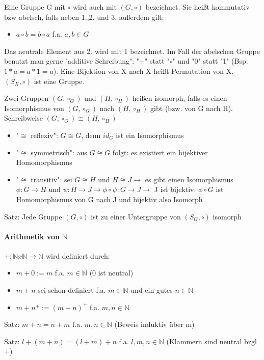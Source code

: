 \documentclass[10pt,landscape]{article}
\begin{document}
\begin{multicols}{3}
Eine Gruppe G mit $\circ$ wird auch mit $(G, \circ)$ bezeichnet. Sie heißt kommutativ bzw abelsch, falls neben 1.,2. und 3. außerdem gilt:
\begin{itemize}
    \item $a\circ b = b\circ a$ f.a. $a,b \in G$
\end{itemize}

Das neutrale Element aus 2. wird mit 1 bezeichnet. Im Fall der abelschen Gruppe benutzt man gerne "additive Schreibung": "+" statt "$\circ$" und "0" statt "1" (Bsp: $1*a = a*1 = a$).
Eine Bijektion von X nach X heißt Permutation von X. $(S_X, \circ)$ ist eine Gruppe.

Zwei Gruppen $(G, \circ_G)$ und $(H,\circ_H)$ heißen isomorph, falls es einen Isomorphismus von $(G,\circ_G)$ nach $(H,\circ_H)$ gibt (bzw. von G nach H). Schreibweise $(G,\circ_G)\cong (H,\circ_H)$
\begin{itemize}
    \item "$\cong$ reflexiv": $G\cong G$, denn $id_G$ ist ein Isomorphismus
    \item "$\cong$ symmetrisch": aus $G\cong G$ folgt: es existiert ein bijektiver Homomorphismus
    \item "$\cong$ transitiv": sei $G\cong H$ und $H\cong J \rightarrow$ es gibt einen Isomorphismus $\phi:G\rightarrow H$ und $\psi:H\rightarrow J \rightarrow \phi\circ \psi :G\rightarrow J \rightarrow$ J ist bijektiv. $\phi\circ G$ ist Homomorphismus von G nach J und bijektiv also Isomorph
\end{itemize}
Satz: Jede Gruppe $(G,\circ)$ ist zu einer Untergruppe von $(S_G, \circ)$ isomorph

\paragraph{Arithmetik von $\mathbb{N}$}
$+: \mathbb{N} x \mathbb{N} \rightarrow \mathbb{N}$ wird definiert durch:
\begin{itemize}
    \item $m+0:=m$ f.a. $m\in \mathbb{N}$ (0 ist neutral)
    \item $m+n$ sei schon definiert f.a. $m\in \mathbb{N}$ und ein gutes $n\in \mathbb{N}$
    \item $m+n^+:=(m+n)^+$ f.a. $m,n \in \mathbb{N}$
\end{itemize}

Satz: $m+n=n+m$ f.a. $m,n\in\mathbb{N}$ (Beweis induktiv über m)

Satz: $l+(m+n)=(l+m)+n$ f.a. $l,m,n\in\mathbb{N}$ (Klammern sind neutral bzgl +)


\end{multicols}
\end{document}

